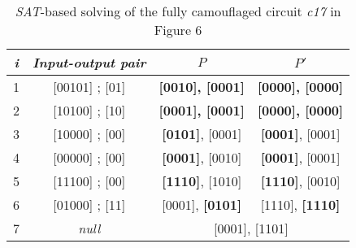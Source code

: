 \begin{table}[]
\centering
\normalsize
\begin{tabular}{|c|c|c|c|}
\hline
\textit{i} & \textit{Input-output pair} & \textit{$P$} & \textit{$P'$} \\ \hline
1 & {[}00101{]} ; {[}01{]} & \textbf{{[}0010{]}, {[}0001{]}} & \textbf{{[}0000{]}, {[}0000{]}} \\ \hline
2 & {[}10100{]} ; {[}10{]} & \textbf{{[}0001{]}, {[}0001{]}} & \textbf{{[}0000{]}, {[}0000{]}} \\ \hline
3 & {[}10000{]} ; {[}00{]} & \textbf{{[}0101{]}}, {[}0001{]} & \textbf{{[}0001{]}}, {[}0001{]} \\ \hline
4 & {[}00000{]} ; {[}00{]} & \textbf{{[}0001{]}}, {[}0010{]} & \textbf{{[}0001{]}}, {[}0001{]} \\ \hline
5 & {[}11100{]} ; {[}00{]} & \textbf{{[}1110{]}}, {[}1010{]} & \textbf{{[}1110{]}}, {[}0010{]} \\ \hline
6 & {[}01000{]} ; {[}11{]} & {[}0001{]}, \textbf{{[}0101{]}} & {[}1110{]}, \textbf{{[}1110{]}} \\ \hline
7 & \textit{null} & \multicolumn{2}{c|}{{[}0001{]}, {[}1101{]}} \\ \hline
\end{tabular}
\caption{\textit{SAT}-based solving of the fully camouflaged circuit \textit{c17} in Figure 6}
\label{tbl:mux4_solving}
\end{table}